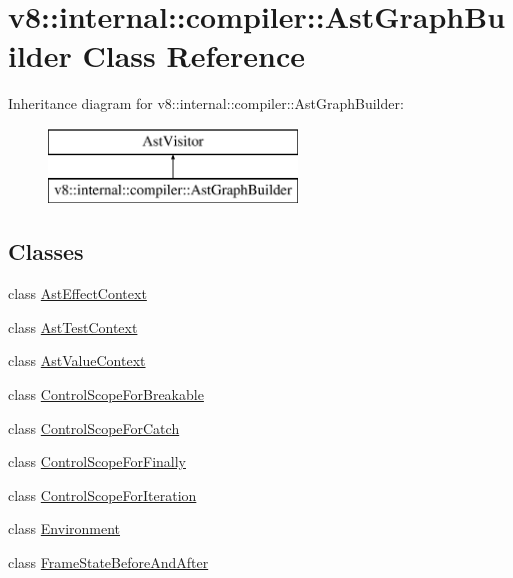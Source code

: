 \hypertarget{classv8_1_1internal_1_1compiler_1_1_ast_graph_builder}{}\section{v8\+:\+:internal\+:\+:compiler\+:\+:Ast\+Graph\+Builder Class Reference}
\label{classv8_1_1internal_1_1compiler_1_1_ast_graph_builder}
Inheritance diagram for v8\+:\+:internal\+:\+:compiler\+:\+:Ast\+Graph\+Builder\+:\begin{figure}[H]
\begin{center}
\leavevmode
\includegraphics[height=2.000000cm]{classv8_1_1internal_1_1compiler_1_1_ast_graph_builder}
\end{center}
\end{figure}
\subsection*{Classes}
\begin{DoxyCompactItemize}
\item 
class \hyperlink{classv8_1_1internal_1_1compiler_1_1_ast_graph_builder_1_1_ast_effect_context}{Ast\+Effect\+Context}
\item 
class \hyperlink{classv8_1_1internal_1_1compiler_1_1_ast_graph_builder_1_1_ast_test_context}{Ast\+Test\+Context}
\item 
class \hyperlink{classv8_1_1internal_1_1compiler_1_1_ast_graph_builder_1_1_ast_value_context}{Ast\+Value\+Context}
\item 
class \hyperlink{classv8_1_1internal_1_1compiler_1_1_ast_graph_builder_1_1_control_scope_for_breakable}{Control\+Scope\+For\+Breakable}
\item 
class \hyperlink{classv8_1_1internal_1_1compiler_1_1_ast_graph_builder_1_1_control_scope_for_catch}{Control\+Scope\+For\+Catch}
\item 
class \hyperlink{classv8_1_1internal_1_1compiler_1_1_ast_graph_builder_1_1_control_scope_for_finally}{Control\+Scope\+For\+Finally}
\item 
class \hyperlink{classv8_1_1internal_1_1compiler_1_1_ast_graph_builder_1_1_control_scope_for_iteration}{Control\+Scope\+For\+Iteration}
\item 
class \hyperlink{classv8_1_1internal_1_1compiler_1_1_ast_graph_builder_1_1_environment}{Environment}
\item 
class \hyperlink{classv8_1_1internal_1_1compiler_1_1_ast_graph_builder_1_1_frame_state_before_and_after}{Frame\+State\+Before\+And\+After}
\end{DoxyCompactItemize}
